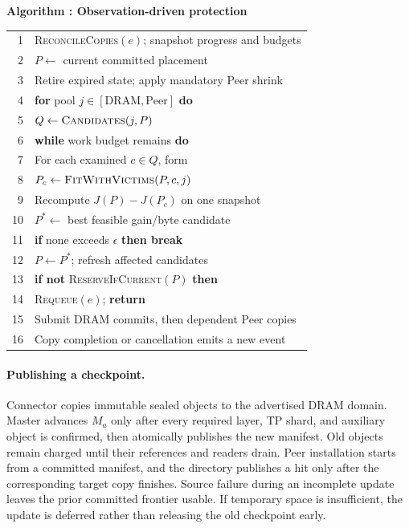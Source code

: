 \par\medskip\noindent\begin{minipage}{\columnwidth}
\raggedright
{}\label{alg:teacher-protection}
\textbf{Algorithm \thedesignalgorithm: Observation-driven protection}
\par\smallskip
\begin{tabularx}{\columnwidth}{@{}r@{\quad}X@{}}
\toprule
1 & \textsc{ReconcileCopies}$(e)$; snapshot progress and budgets \\
2 & $P\gets$ current committed placement \\
3 & Retire expired state; apply mandatory Peer shrink \\
4 & \textbf{for} pool $j\in[\mathrm{DRAM},\mathrm{Peer}]$ \textbf{do} \\
5 & \quad $Q\gets\textsc{Candidates}(j,P)$ \\
6 & \quad \textbf{while} work budget remains \textbf{do} \\
7 & \qquad For each examined $c\in Q$, form \\
8 & \qquad $P_c\gets\textsc{FitWithVictims}(P,c,j)$ \\
9 & \qquad Recompute $J(P)-J(P_c)$ on one snapshot \\
10 & \qquad $P^*\gets$ best feasible gain/byte candidate \\
11 & \qquad \textbf{if} none exceeds $\epsilon$ \textbf{then break} \\
12 & \qquad $P\gets P^*$; refresh affected candidates \\
13 & \textbf{if not} \textsc{ReserveIfCurrent}$(P)$ \textbf{then} \\
14 & \quad \textsc{Requeue}$(e)$; \textbf{return} \\
15 & Submit DRAM commits, then dependent Peer copies \\
16 & Copy completion or cancellation emits a new event \\
\bottomrule
\end{tabularx}
\end{minipage}\par\medskip

\paragraph{Publishing a checkpoint.}
Connector copies immutable sealed objects to the advertised DRAM
domain. Master advances $M_a$ only after every required layer, TP shard,
and auxiliary object is confirmed, then atomically publishes the new
manifest. Old objects remain charged until their references and readers
drain. Peer installation starts from a committed manifest, and the
directory publishes a hit only after the corresponding target copy
finishes. Source failure during an incomplete update leaves the prior
committed frontier usable. If temporary space is insufficient, the
update is deferred rather than releasing the old checkpoint early.

